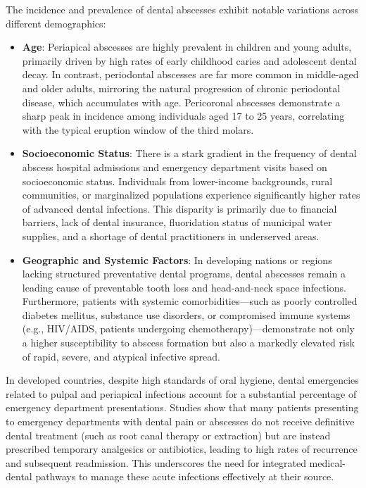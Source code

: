 The incidence and prevalence of dental abscesses exhibit notable variations across different demographics:
\begin{itemize}
  \item \textbf{Age}: Periapical abscesses are highly prevalent in children and young adults, primarily driven by high rates of early childhood caries and adolescent dental decay. In contrast, periodontal abscesses are far more common in middle-aged and older adults, mirroring the natural progression of chronic periodontal disease, which accumulates with age. Pericoronal abscesses demonstrate a sharp peak in incidence among individuals aged 17 to 25 years, correlating with the typical eruption window of the third molars.
  \item \textbf{Socioeconomic Status}: There is a stark gradient in the frequency of dental abscess hospital admissions and emergency department visits based on socioeconomic status. Individuals from lower-income backgrounds, rural communities, or marginalized populations experience significantly higher rates of advanced dental infections. This disparity is primarily due to financial barriers, lack of dental insurance, fluoridation status of municipal water supplies, and a shortage of dental practitioners in underserved areas.
  \item \textbf{Geographic and Systemic Factors}: In developing nations or regions lacking structured preventative dental programs, dental abscesses remain a leading cause of preventable tooth loss and head-and-neck space infections. Furthermore, patients with systemic comorbidities---such as poorly controlled diabetes mellitus, substance use disorders, or compromised immune systems (e.g., HIV/AIDS, patients undergoing chemotherapy)---demonstrate not only a higher susceptibility to abscess formation but also a markedly elevated risk of rapid, severe, and atypical infective spread.
\end{itemize}

In developed countries, despite high standards of oral hygiene, dental emergencies related to pulpal and periapical infections account for a substantial percentage of emergency department presentations. Studies show that many patients presenting to emergency departments with dental pain or abscesses do not receive definitive dental treatment (such as root canal therapy or extraction) but are instead prescribed temporary analgesics or antibiotics, leading to high rates of recurrence and subsequent readmission. This underscores the need for integrated medical-dental pathways to manage these acute infections effectively at their source.

